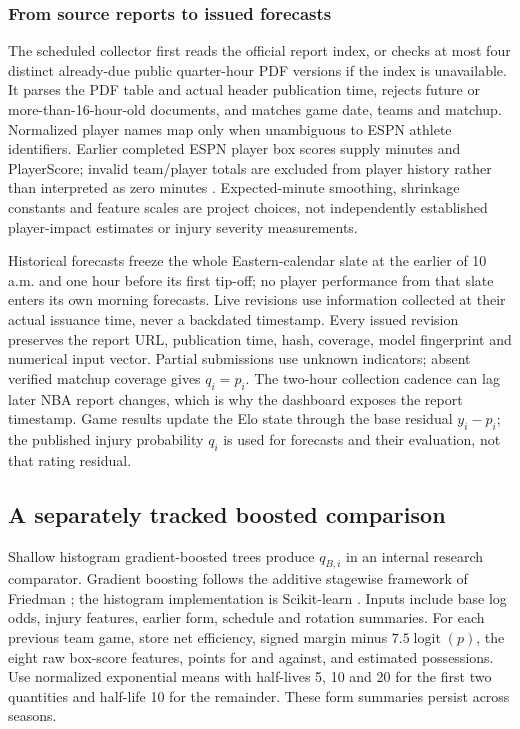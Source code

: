 \documentclass[11pt]{article}
\begin{document}
\subsubsection{From source reports to issued forecasts}
The scheduled collector first reads the official report index, or checks at
most four distinct already-due public quarter-hour PDF versions if the index
is unavailable. It parses the PDF table and actual header publication time,
rejects future or more-than-16-hour-old documents, and matches game date,
teams and matchup. Normalized player names map only when unambiguous to
ESPN athlete identifiers. Earlier completed ESPN player box scores supply
minutes and PlayerScore; invalid team/player totals are excluded from player
history rather than interpreted as zero minutes \cite{espn,sportsdataverse}.
Expected-minute smoothing, shrinkage constants and feature scales are project choices, not independently established player-impact
estimates or injury severity measurements.

Historical forecasts freeze the whole Eastern-calendar slate at the earlier
of 10 a.m. and one hour before its first tip-off; no player performance from
that slate enters its own morning forecasts. Live revisions use information
collected at their actual issuance time, never a backdated timestamp.
Every issued revision preserves the report URL, publication time, hash,
coverage, model fingerprint and numerical input vector. Partial submissions
use unknown indicators; absent verified matchup coverage gives $q_i=p_i$.
The two-hour collection cadence can lag later NBA report changes, which is
why the dashboard exposes the report timestamp. Game results update the Elo
state through the base residual $y_i-p_i$; the published injury probability
$q_i$ is used for forecasts and their evaluation, not that rating residual.

\subsection{A separately tracked boosted comparison}
Shallow histogram gradient-boosted trees produce $q_{B,i}$ in an internal
research comparator. Gradient boosting follows the additive stagewise
framework of Friedman \cite{friedman}; the histogram implementation is
Scikit-learn \cite{boosting}. Inputs include
base log odds, injury features, earlier form, schedule and rotation summaries.
For each previous team game, store net efficiency, signed margin minus
$7.5\operatorname{logit}(p)$, the eight raw box-score features, points for
and against, and estimated possessions. Use normalized exponential means
with half-lives 5, 10 and 20 for the first two quantities and half-life 10
for the remainder. These form summaries persist across seasons.
\end{document}
